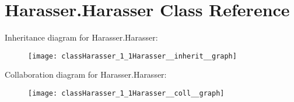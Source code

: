 \hypertarget{classHarasser_1_1Harasser}{\section{Harasser.\-Harasser Class Reference}
\label{classHarasser_1_1Harasser}
}


Inheritance diagram for Harasser.\-Harasser\-:\nopagebreak
\begin{figure}[H]
\begin{center}
\leavevmode
\texttt{[image: classHarasser\_1\_1Harasser\_\_inherit\_\_graph]}
\end{center}
\end{figure}


Collaboration diagram for Harasser.\-Harasser\-:\nopagebreak
\begin{figure}[H]
\begin{center}
\leavevmode
\texttt{[image: classHarasser\_1\_1Harasser\_\_coll\_\_graph]}
\end{center}
\end{figure}
